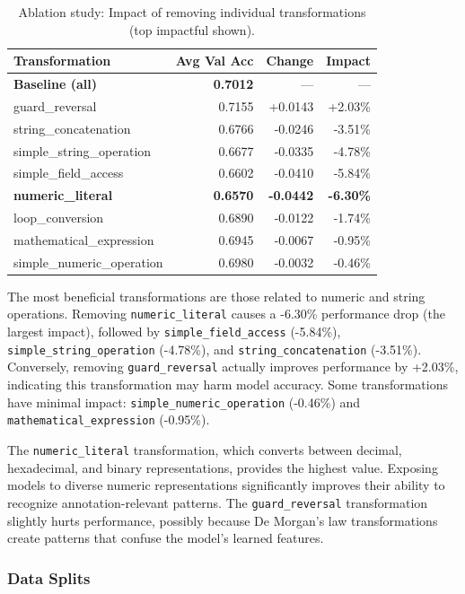 \documentclass[acmsmall,screen,review,anonymous]{acmart}
\begin{document}
\begin{table}[t]
\caption{Ablation study: Impact of removing individual transformations (top impactful shown).}
\label{tab:ablation2}
\begin{tabular}{lrrr}
\toprule
\textbf{Transformation} & \textbf{Avg Val Acc} & \textbf{Change} & \textbf{Impact} \\
\midrule
\textbf{Baseline (all)} & \textbf{0.7012} & --- & --- \\
guard\_reversal & 0.7155 & +0.0143 & +2.03\% \\
string\_concatenation & 0.6766 & -0.0246 & -3.51\% \\
simple\_string\_operation & 0.6677 & -0.0335 & -4.78\% \\
simple\_field\_access & 0.6602 & -0.0410 & -5.84\% \\
\textbf{numeric\_literal} & \textbf{0.6570} & \textbf{-0.0442} & \textbf{-6.30\%} \\
loop\_conversion & 0.6890 & -0.0122 & -1.74\% \\
mathematical\_expression & 0.6945 & -0.0067 & -0.95\% \\
simple\_numeric\_operation & 0.6980 & -0.0032 & -0.46\% \\
\bottomrule
\end{tabular}
\end{table}

The most beneficial transformations are those related to numeric and string operations. Removing \texttt{numeric\_literal} causes a -6.30\% performance drop (the largest impact), followed by \texttt{simple\_field\_access} (-5.84\%), \texttt{simple\_string\_operation} (-4.78\%), and \texttt{string\_concatenation} (-3.51\%). Conversely, removing \texttt{guard\_reversal} actually improves performance by +2.03\%, indicating this transformation may harm model accuracy. Some transformations have minimal impact: \texttt{simple\_numeric\_operation} (-0.46\%) and \texttt{mathematical\_expression} (-0.95\%).

The \texttt{numeric\_literal} transformation, which converts between decimal, hexadecimal, and binary representations, provides the highest value. Exposing models to diverse numeric representations significantly improves their ability to recognize annotation-relevant patterns. The \texttt{guard\_reversal} transformation slightly hurts performance, possibly because De Morgan's law transformations create patterns that confuse the model's learned features.

\subsubsection{Data Splits}
\label{sec:splits}
\end{document}
